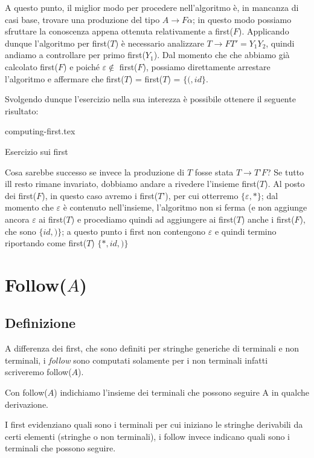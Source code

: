 \documentclass[class=book, crop=false, oneside, 12pt]{standalone}
\begin{document}
A questo punto, il miglior modo per procedere nell'algoritmo è, in mancanza di casi base, trovare una produzione del tipo \(A \rightarrow F\alpha\); in questo modo possiamo sfruttare la conoscenza appena ottenuta relativamente a first(\(F\)). Applicando dunque l'algoritmo per first(\(T\)) è necessario analizzare \(T \rightarrow FT' = Y_1Y_2\), quindi andiamo a controllare per primo first(\(Y_1\)). Dal momento che che abbiamo già calcolato first(\(F\)) e poiché \(\varepsilon \notin\) first(\(F\)), possiamo direttamente arrestare l'algoritmo e affermare che first(\(T\)) = first(\(T\)) = \(\{(, id\}\).

Svolgendo dunque l'esercizio nella sua interezza è possibile ottenere il seguente risultato:

\begin{table}[H]
	\centering
	{computing-first.tex}
    \caption{Esercizio sui first}
    \label{computing-first}
\end{table}

Cosa sarebbe successo se invece la produzione di \(T\) fosse stata \(T \to T’F\)? Se tutto ill resto rimane invariato, dobbiamo andare a rivedere l'insieme first(\(T\)). Al posto dei first(\(F\)), in questo caso avremo i first(\(T’\)), per cui otterremo \(\{\varepsilon, \ast\}\); dal momento che \(\varepsilon\) è contenuto nell'insieme, l’algoritmo non si ferma (e non aggiunge ancora \(\varepsilon\) ai first(\(T\)) e procediamo quindi ad aggiungere ai first(\(T\)) anche i first(\(F\)), che sono \(\{id, )\}\); a questo punto i first non contengono \(\varepsilon\) e quindi termino riportando come first(\(T\)) \(\{\ast, id, )\}\)

\section{Follow(\(A\))}
\subsection{Definizione}
A differenza dei first, che sono definiti per stringhe generiche di terminali e non terminali, i \emph{follow} sono computati solamente per i non terminali infatti scriveremo follow(\(A\)).
\begin{definition}
    Con follow(\(A\)) indichiamo l'insieme dei terminali che possono seguire A in qualche derivazione.    
\end{definition}
I first evidenziano quali sono i terminali per cui iniziano le stringhe derivabili da certi elementi (stringhe o non terminali), i follow invece indicano quali sono i terminali che possono seguire.
\end{document}

